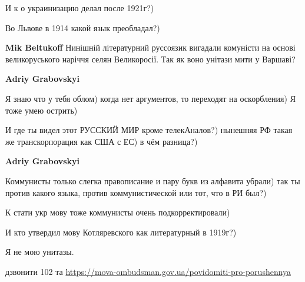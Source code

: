 \begin{itemize}
\begin{itemize}
И к о украинизацию делал после 1921г?)

Во Львове в 1914 какой язык преобладал?)

 
\textbf{Mik Beltukoff} Нинішній літературний руссоязик вигадали комуністи на
основі великоруського наріччя селян Великоросії. Так як воно унітази мити у
Варшаві?

 
\textbf{Adriy Grabovskyi} 

Я знаю что у тебя облом) когда нет аргументов, то переходят на оскорбления) Я
тоже умею острить)

И где ты видел этот РУССКИЙ МИР кроме телекАналов?) нынешняя РФ такая же
транскорпорация как США с ЕС) в чём разница?)


 
\textbf{Adriy Grabovskyi}

Коммунисты только слегка правописание и пару букв из алфавита убрали) так ты
против какого языка, против коммунистической или тот, что в РИ был?)

К стати укр мову тоже коммунисты очень подкорректировали)

И кто утвердил мову Котляревского как литературный в 1919г?)

Я не мою унитазы.

\end{itemize}

 
дзвонити 102 та
\url{https://mova-ombudsman.gov.ua/povidomiti-pro-porushennya}


\end{itemize}
